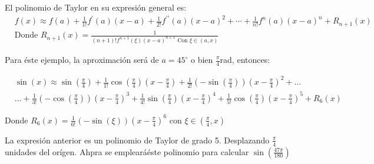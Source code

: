 El polinomio de Taylor en su expresión general es:
\begin{align*}
	 & f(x)\approx f(a)+\frac{1}{1!}f^{\prime}(a)(x-a)+\frac{1}{2!}f^{\prime\prime}(a)(x-a)^2+\cdots+\frac{1}{n!}f^n(a)(x-a)^n+R_{n+1}(x) \\
	 & \text{Donde }R_{n+1}(x)=\frac{1}{(n+1)!f^{n+1}(\xi)(x-a)^{n+1}\text{ Con } \xi\in (a,x)}
\end{align*}

Para éste ejemplo, la aproximación será de $a=45^{\circ}$ o bien $\frac{\pi}{4}$rad, entonces:

\begin{align*}
	 & \sin(x)\approx \sin\left(\frac{\pi}{4}\right)+\frac{1}{1!}\cos\left(\frac{\pi}{4}\right)\left(x-\frac{\pi}{4}\right)+\frac{1}{2!}\left(-\sin \left(\frac{\pi}{4}\right)\right)\left(x-\frac{\pi}{4}\right)^2+\dots                                       \\
	 & \dots+\frac{1}{3!}\left(-\cos\left(\frac{\pi}{4}\right) \right)\left(x-\frac{\pi}{4}\right)^3+\frac{1}{4!}\sin \left(\frac{\pi}{4}\right)\left(x-\frac{\pi}{4}\right)^4+\frac{1}{5!}\cos \left(\frac{\pi}{4}\right)\left(x-\frac{\pi}{4}\right)^5+R_6(x)
\end{align*}

Donde $R_6(x)=\frac{1}{6!}\left(-\sin(\xi)\right)\left(x-\frac{\pi}{4}\right)^6$ con $\xi \in \left(\frac{\pi}{4},x\right)$


La expresión anterior es un polinomio de Taylor de grado 5. Desplazando $\frac{\pi}{4}$ unidades del orígen. Ahpra se emplearáéste polinomio para calcular $\sin\left(\frac{47\pi}{180}\right)$

